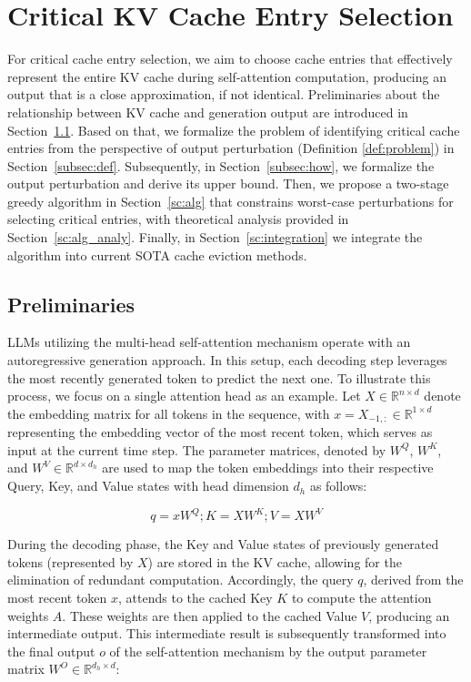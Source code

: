 \section{Critical KV Cache Entry Selection}

For critical cache entry selection, we aim to choose cache entries that effectively represent the entire KV cache during self-attention computation, producing an output that is a close approximation, if not identical.
Preliminaries about the relationship between KV cache and generation output are introduced in Section~\ref{subsec:pre}.
Based on that, we formalize the problem of identifying critical cache entries from the perspective of output perturbation (Definition \ref{def:problem}) in Section~\ref{subsec:def}. Subsequently, in Section~\ref{subsec:how}, we formalize the output perturbation and derive its upper bound.
Then, we propose a two-stage greedy algorithm in Section~\ref{sc:alg} that constrains worst-case perturbations for selecting critical entries, with theoretical analysis provided in Section~\ref{sc:alg_analy}.
Finally, in Section~\ref{sc:integration} we integrate the algorithm into current SOTA cache eviction methods.


\subsection{Preliminaries}
\label{subsec:pre}
LLMs utilizing the multi-head self-attention mechanism operate with an autoregressive generation approach. In this setup, each decoding step leverages the most recently generated token to predict the next one. To illustrate this process, we focus on a single attention head as an example.
Let $X \in \mathbb{R}^{n \times d}$ denote the embedding matrix for all tokens in the sequence, with $x = X_{-1,:} \in \mathbb{R}^{1 \times d}$ representing the embedding vector of the most recent token, which serves as input at the current time step.
The parameter matrices, denoted by $W^Q$, $W^K$, and $W^V \in \mathbb{R}^{d \times d_h}$ are used to map the token embeddings into their respective Query, Key, and Value states with head dimension $d_h$ as follows:

{\small
\begin{equation}
	q = xW^Q ; K = XW^K; V = XW^V
\end{equation}
}

During the decoding phase, the Key and Value states of previously generated tokens (represented by $X$) are stored in the KV cache, allowing for the elimination of redundant computation.
Accordingly, the query $q$, derived from the most recent token $x$, attends to the cached Key $K$ to compute the attention weights $A$. These weights are then applied to the cached Value $V$, producing an intermediate output.
This intermediate result is subsequently transformed into the final output $o$ of the self-attention mechanism by the output parameter matrix $W^O \in \mathbb{R}^{d_h \times d}$:

